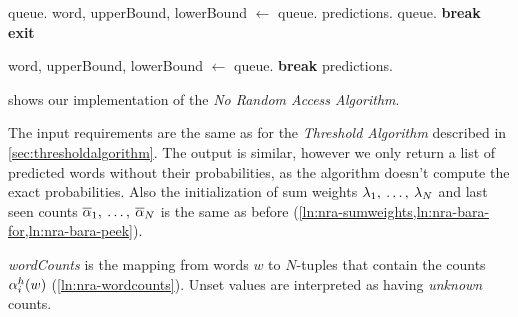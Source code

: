 \begin{algorithm}
\begin{algorithmic}[1]
      \vspace{0.7em}
      \State queue.
        \label{ln:nra-queue-push}
        \label{ln:nra-while-true}
        \State word, upperBound, lowerBound $\gets$ queue.
          \label{ln:nra-queue-pop}
          \label{ln:nra-lowerbound-greater}
          \State predictions.
            \label{ln:nra-certain-predict}
        \Else
          \State queue.
            \label{ln:nra-queue-readd}
          \State \textbf{break}
            \label{ln:nra-predict-break}
        \EndIf
          \label{ln:nra-isdone}
          \State \textbf{exit}
            \label{ln:nra-exit}
        \EndIf
      \EndWhile
    \EndWhile

    \vspace{0.7em}
      \label{ln:nra-for-limit}
      \State word, upperBound, lowerBound $\gets$ queue.
        \label{ln:nra-pop-2}
        \label{ln:nra-upperbound-zero-if}
        \State \textbf{break}
          \label{ln:nra-upperbound-zero-break}
      \EndIf
      \State predictions.
        \label{ln:nra-limit-predict}
    \EndFor
  \end{algorithmic}
\end{algorithm}

 shows our implementation of the
\emph{No Random Access Algorithm}.

The input requirements are the same as for the \emph{Threshold Algorithm}
described in \cref{sec:thresholdalgorithm}.
The output is similar, however we only return a list of predicted words without
their probabilities, as the algorithm doesn't compute the exact probabilities.
Also the initialization of sum weights
$\lambda_1, \: \ldots, \: \lambda_N$ and last seen counts
$\overline{\alpha}_1, \: \ldots, \: \overline{\alpha}_N$ is the same as
before (\cref{ln:nra-sumweights,ln:nra-bara-for,ln:nra-bara-peek}).

\emph{wordCounts} is the mapping from words $w$ to $N$-tuples that contain the
counts $\alpha^h_i(w)$ (\cref{ln:nra-wordcounts}).
Unset values are interpreted as having \emph{unknown} counts.

